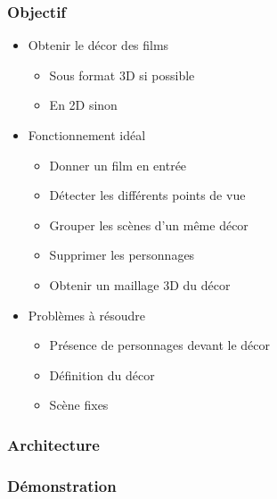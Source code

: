  \begin{frame}
   \frametitle{Objectif}
   
   \begin{itemize}
   \item Obtenir le décor des films
   	\begin{itemize}
   	\item Sous format 3D si possible
   	\item En 2D sinon
   	\end{itemize}
   	
   \item Fonctionnement idéal
   	\begin{itemize}
   	\item Donner un film en entrée
   	\item Détecter les différents points de vue
   	\item Grouper les scènes d'un même décor
   	\item Supprimer les personnages
   	\item Obtenir un maillage 3D du décor
   	\end{itemize}
   
   \item Problèmes à résoudre
  	\begin{itemize}
	\item Présence de personnages devant le décor
	\item Définition du décor
	\item Scène fixes
  	\end{itemize}

   \end{itemize}
	
 \end{frame}
 
\begin{frame}
  \frametitle{Architecture}

\end{frame}


 \begin{frame}
   \frametitle{Démonstration}


 \end{frame}
